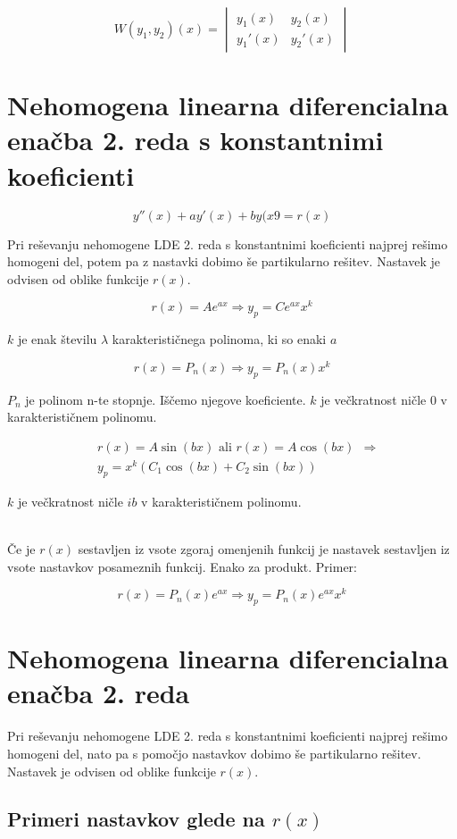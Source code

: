 \documentclass[12pt]{report}
\begin{document}
\[
W(y_1,y_2)(x)=
\begin{vmatrix}
y_1(x) & y_2(x)\\ 
y_1'(x) & y_2'(x)
\end{vmatrix}
\]


\section*{Nehomogena linearna diferencialna enačba 2. reda s konstantnimi koeficienti}

\[y''(x) +ay'(x) +by(x9 = r(x)\]

Pri reševanju nehomogene LDE 2. reda s konstantnimi koeficienti najprej rešimo homogeni del, potem pa z nastavki dobimo še partikularno rešitev. Nastavek je odvisen od oblike funkcije $r(x)$.

\[r(x) = Ae^{ax} \Rightarrow y_p = Ce^{ax}x^k\]

$k$ je enak številu $\lambda$ karakterističnega polinoma, ki so enaki $a$

\[r(x) = P_n(x) \Rightarrow y_p = P_n(x)x^k\]

$P_n$ je polinom n-te stopnje. Iščemo njegove koeficiente. $k$ je večkratnost ničle 0 v karakterističnem polinomu.



\begin{align*} 
&r(x)=A\sin(bx) \text{ ali } r(x)=A\cos(bx)\ \ \Rightarrow \\ \ &y_p=x^k(C_1\cos(bx)+C_2\sin(bx))
\end{align*} 

$k$ je večkratnost ničle $ib$ v karakterističnem polinomu.\\\ 

Če je $r(x)$ sestavljen iz vsote zgoraj omenjenih funkcij je nastavek sestavljen iz vsote nastavkov posameznih funkcij. Enako za produkt. Primer:

\[r(x) = P_n(x)e^{ax} \Rightarrow y_p = P_n(x)e^{ax}x^k\]


\section*{Nehomogena linearna diferencialna enačba 2. reda}

Pri reševanju nehomogene LDE 2. reda s konstantnimi koeficienti najprej rešimo homogeni del, nato pa
s pomočjo nastavkov dobimo še partikularno rešitev. Nastavek je odvisen od oblike funkcije $r(x)$.


\subsection*{Primeri nastavkov glede na $r(x)$}
\end{document}
